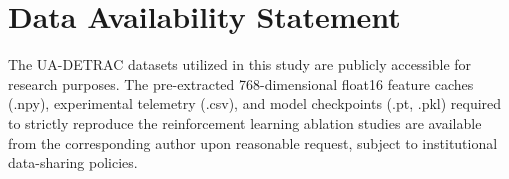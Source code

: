 \section*{Data Availability Statement}
The UA-DETRAC datasets utilized in this study are publicly accessible for research purposes. The pre-extracted 768-dimensional float16 feature caches (.npy), experimental telemetry (.csv), and model checkpoints (.pt, .pkl) required to strictly reproduce the reinforcement learning ablation studies are available from the corresponding author upon reasonable request, subject to institutional data-sharing policies.
